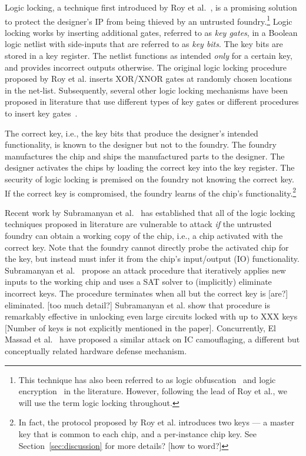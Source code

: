 Logic locking, a technique first introduced by Roy et al.~\cite{roy2008epic}, 
is a promising solution to protect the designer's IP from 
being thieved by an untrusted foundry.\footnote{This technique has 
also been referred to as logic obfuscation~\cite{rajendran2012security} and logic encryption~\cite{dupuis2014novel,rajendran2012logic,rajendran2015fault} in the literature. However, following the lead of Roy et al., we will use the term logic locking throughout.}  
Logic locking works by inserting 
additional gates, referred to as \emph{key gates}, 
in a Boolean 
logic netlist with 
side-inputs that are referred to as \emph{key bits}. The key bits 
are 
stored in a key register. 
The netlist functions as intended \emph{only} 
for a certain key, and provides incorrect
outputs otherwise. 
The original logic locking procedure proposed by Roy et al. 
inserts XOR/XNOR gates at randomly chosen locations in the 
net-list. Subsequently, several other logic locking mechanisms have been proposed in literature that use different types of key gates or 
different procedures to insert key gates~\cite{rajendran2012security,rajendran2012logic,rajendran2015fault,plaza2015solving,dupuis2014novel,chakraborty2009harpoon,baumgartenpreventing}. 

The correct key, i.e., 
the key bits that produce the designer's intended 
functionality, 
is known to the designer but not to the foundry. The foundry manufactures the chip and ships the manufactured parts to the 
designer. The designer activates the chips by loading the 
correct key into the key register. 
The security of logic locking 
is premised on the foundry not knowing the correct key.
If the correct key is compromised, the foundry learns of the 
chip's functionality.\footnote{In fact, the protocol proposed by Roy et al. introduces two keys --- a master key that is common to each chip, and a per-instance chip key. See Section~\ref{sec:discussion} for more details? [how to word?]} 

  
Recent work by Subramanyan et al.~\cite{subramanyan2015evaluating} has 
established 
that all
of the logic locking techniques proposed in literature
are vulnerable to attack \emph{if} the 
untrusted foundry can obtain a 
working copy of the chip, i.e., 
a chip activated with the correct key. 
Note that the foundry cannot directly 
probe the activated chip for the key, but instead 
must infer it from 
the chip's input/output (IO) functionality.   
Subramanyan
et al.~\cite{subramanyan2015evaluating} propose an attack procedure that 
iteratively applies new inputs to the working chip and 
uses a SAT solver to 
(implicitly) eliminate incorrect keys. 
The procedure terminates when 
all but the correct key is [are?] eliminated. 
[too much detail?]
Subramanyan et al. show that procedure is 
remarkably effective in unlocking even large circuits locked 
with up to XXX keys [Number of keys is not explicitly mentioned in the paper]. Concurrently, El Massad et al.~\cite{el2015integrated} 
have proposed a similar attack on IC camouflaging, 
a different but conceptually related hardware 
defense mechanism.

